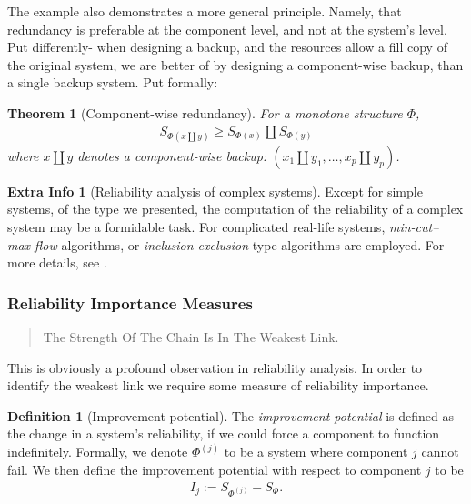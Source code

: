 \documentclass[12pt,a4paper]{report}
\theoremstyle{plain}
\newtheorem{theorem}{Theorem}[section]
\theoremstyle{definition}
\newtheorem{definition}{Definition}
\newtheorem{extra}{Extra Info}
\newcommand{\struct}{\Phi}
\begin{document}
The example also demonstrates a more general principle. Namely, that redundancy is preferable at the component level, and not at the system's level.
Put differently- when designing a backup, and the resources allow a fill copy of the original system, we are better of by designing a component-wise backup, than a single backup system.
Put formally:
\begin{theorem}[Component-wise redundancy]
For a monotone structure $\Phi$, 
\begin{align}
	S_{\struct(x \coprod y)} \geq S_{\struct(x)} \coprod S_{\struct(y)}
\end{align}
where $x \coprod y$ denotes a component-wise backup: $(x_1 \coprod y_1,\dots,x_p \coprod y_p)$.
\end{theorem}



\begin{extra}[Reliability analysis of complex systems]
Except for simple systems, of the type we presented, the computation of the reliability of a complex system may be a formidable task. 
For complicated real-life systems, \emph{min-cut--max-flow} algorithms, or \emph{inclusion-exclusion} type algorithms are employed. 
For more details, see \cite{aven_stochastic_1999}.
\end{extra}









\subsubsection{Reliability Importance Measures}
\begin{quotation}
The Strength Of The Chain Is In The Weakest Link.
\end{quotation}
This is obviously a profound observation in reliability analysis.
In order to identify the weakest link we require some measure of reliability importance.


\begin{definition}[Improvement potential]
The \emph{improvement potential} is defined as the change in a system's reliability, if we could force a component to function indefinitely.
Formally, we denote $\Phi^{(j)}$ to be a system where component $j$ cannot fail. 
We then define the improvement potential with respect to component $j$ to be 
\begin{align}
	I_j :=S_{\Phi^{(j)}}-S_{\Phi}.
\end{align}
\end{definition}
\end{document}

